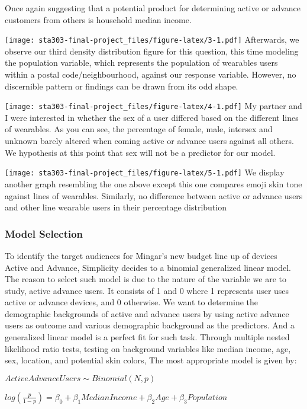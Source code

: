 \documentclass[
          english,
          paper=a4,
              ,captions=tableheading
  ]{scrartcl}
\begin{document}
Once again suggesting that a potential product for determining active or
advance customers from others is household median income.

\texttt{[image: sta303-final-project\_files/figure-latex/3-1.pdf]}
Afterwards, we observe our third density distribution figure for this
question, this time modeling the population variable, which represents
the population of wearables users within a postal code/neighbourhood,
against our response variable. However, no discernible pattern or
findings can be drawn from its odd shape.

\texttt{[image: sta303-final-project\_files/figure-latex/4-1.pdf]} My
partner and I were interested in whether the sex of a user differed
based on the different lines of wearables. As you can see, the
percentage of female, male, intersex and unknown barely altered when
coming active or advance users against all others. We hypothesis at this
point that sex will not be a predictor for our model.

\texttt{[image: sta303-final-project\_files/figure-latex/5-1.pdf]} We
display another graph resembling the one above except this one compares
emoji skin tone against lines of wearables. Similarly, no difference
between active or advance users and other line wearable users in their
percentage distribution

\hypertarget{model-selection}{%
\subsubsection{Model Selection}\label{model-selection}}

To identify the target audiences for Mingar's new budget line up of
devices Active and Advance, Simplicity decides to a binomial generalized
linear model. The reason to select such model is due to the nature of
the variable we are to study, active advance users. It consists of 1 and
0 where 1 represents user uses active or advance devices, and 0
otherwise. We want to determine the demographic backgrounds of active
and advance users by using active advance users as outcome and various
demographic background as the predictors. And a generalized linear model
is a perfect fit for such task. Through multiple nested likelihood ratio
tests, testing on background variables like median income, age, sex,
location, and potential skin colors, The most appropriate model is given
by:

\(ActiveAdvanceUsers \sim Binomial(N,p)\)

\(log(\frac{p}{1-p})={\beta_0} +{\beta_1}MedianIncome+{\beta_2}Age+{\beta_3}Population\)
\end{document}
